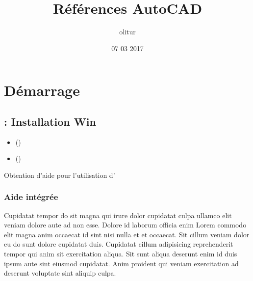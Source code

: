 \documentclass[a4paper,10pt,french]{sphinxmanual}
\title{Références AutoCAD}
\date{07 03 2017}
\author{olitur}
\begin{document}
\maketitle
\sphinxtableofcontents
{}\label{\detokenize{docs/refs/index::doc}}



\chapter{Démarrage}
\label{\detokenize{docs/refs/start/index:acad-refs}}\label{\detokenize{docs/refs/start/index:references-acad}}\label{\detokenize{docs/refs/start/index:demarrage}}\label{\detokenize{docs/refs/start/index::doc}}

\section{ : Installation Win}
\label{\detokenize{docs/refs/start/install/installation-win:acad-installation-win}}\label{\detokenize{docs/refs/start/install/installation-win::doc}}

\begin{sphinxShadowBox}
\begin{itemize}
\item {} 
\label{\detokenize{docs/refs/start/install/installation-win:id1}}{\hyperref[\detokenize{docs/refs/start/install/installation-win:aide-integree}]{}} ()

\item {} 
\label{\detokenize{docs/refs/start/install/installation-win:id2}}{\hyperref[\detokenize{docs/refs/start/install/installation-win:aide-en-ligne-internet}]{}} ()

\end{itemize}
\end{sphinxShadowBox}

Obtention d'aide pour l'utilisation d'


\subsection{Aide intégrée}
\label{\detokenize{docs/refs/start/install/installation-win:aide-integree}}
Cupidatat tempor do sit magna qui irure dolor cupidatat culpa ullamco elit veniam dolore aute ad non esse. Dolore id laborum officia enim Lorem commodo elit magna anim occaecat id sint nisi nulla et et occaecat. Sit cillum veniam dolor eu do sunt dolore cupidatat duis. Cupidatat cillum adipisicing reprehenderit tempor qui anim sit exercitation aliqua. Sit sunt aliqua deserunt enim id duis ipsum aute sint eiusmod cupidatat. Anim proident qui veniam exercitation ad deserunt voluptate sint aliquip culpa.
\end{document}
